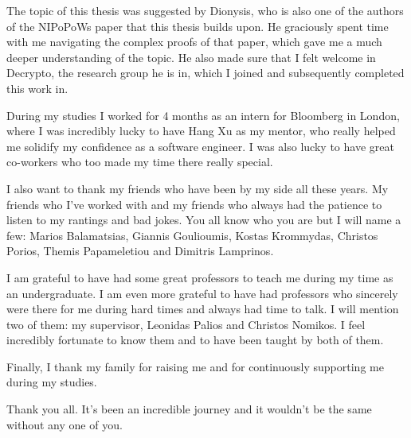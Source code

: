 \documentclass{report}
\begin{document}
The topic of this thesis was suggested by Dionysis, who is also one of the authors of the NIPoPoWs paper that this thesis builds upon. He graciously spent time with me navigating the complex proofs of that paper, which gave me a much deeper understanding of the topic. He also made sure that I felt welcome in Decrypto, the research group he is in, which I joined and subsequently completed this work in.

During my studies I worked for 4 months as an intern for Bloomberg in London, where I was incredibly lucky to have Hang Xu as my mentor, who really helped me solidify my confidence as a software engineer. I was also lucky to have great co-workers who too made my time there really special.

I also want to thank my friends who have been by my side all these years. My friends who I've worked with and my friends who always had the patience to listen to my rantings and bad jokes. You all know who you are but I will name a few: Marios Balamatsias, Giannis Goulioumis, Kostas Krommydas, Christos Porios, Themis Papameletiou and Dimitris Lamprinos.

I am grateful to have had some great professors to teach me during my time as an undergraduate. I am even more grateful to have had professors who sincerely were there for me during hard times and always had time to talk. I will mention two of them: my supervisor, Leonidas Palios and Christos Nomikos. I feel incredibly fortunate to know them and to have been taught by both of them.

Finally, I thank my family for raising me and for continuously supporting me during my studies.

Thank you all. It's been an incredible journey and it wouldn't be the same without any one of you.

\thispagestyle{empty}
\newpage

\tableofcontents
\thispagestyle{empty}
\newpage
\setcounter{page}{1}








\end{document}
